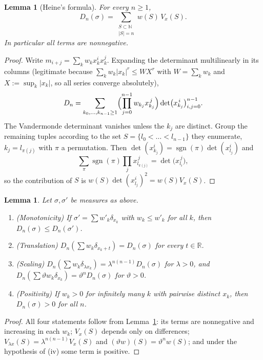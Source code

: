 \documentclass{amsart}
\newtheorem{lemma}[theorem]{Lemma}
\theoremstyle{definition}
\theoremstyle{remark}
\numberwithin{equation}{section}
\newcommand{\N}{\mathbb{N}}
\newcommand{\R}{\mathbb{R}}
\begin{document}
\begin{lemma}[Heine's formula]\label{lem:heine}
For every $n\ge1$,
\[
  D_n(\sigma)=\sum_{\substack{S\subset\N\\|S|=n}}w(S)\,V_x(S).
\]
In particular all terms are nonnegative.
\end{lemma}

\begin{proof}
Write $m_{i+j}=\sum_kw_kx_k^ix_k^j$. Expanding the determinant multilinearly in its columns (legitimate because
$\sum_kw_k|x_k|^r\le WX^r$ with $W=\sum_kw_k$ and $X:=\sup_k|x_k|$, so all series converge absolutely),
\[
  D_n=\sum_{k_0,\dots,k_{n-1}\ge1}\Bigl(\prod_{j=0}^{n-1}w_{k_j}x_{k_j}^{\,j}\Bigr)\det\bigl(x_{k_j}^{\,i}\bigr)_{i,j=0}^{n-1}.
\]
The Vandermonde determinant vanishes unless the $k_j$ are distinct. Group the remaining tuples according to the set
$S=\{l_0<\dots<l_{n-1}\}$ they enumerate, $k_j=l_{\pi(j)}$ with $\pi$ a permutation. Then
$\det(x_{k_j}^i)=\operatorname{sgn}(\pi)\det(x_{l_j}^i)$ and
\[
  \sum_\pi\operatorname{sgn}(\pi)\prod_jx_{l_{\pi(j)}}^{\,j}=\det\bigl(x_{l_i}^{\,j}\bigr),
\]
so the contribution of $S$ is $w(S)\det(x_{l_j}^i)^2=w(S)V_x(S)$.
\end{proof}

\begin{lemma}\label{lem:elem}
Let $\sigma,\sigma'$ be measures as above.
\begin{enumerate}
\item (Monotonicity) If $\sigma'=\sum w'_k\delta_{x_k}$ with $w_k\le w'_k$ for all $k$, then
  $D_n(\sigma)\le D_n(\sigma')$.
\item (Translation) $D_n(\sum w_k\delta_{x_k+t})=D_n(\sigma)$ for every $t\in\R$.
\item (Scaling) $D_n(\sum w_k\delta_{\lambda x_k})=\lambda^{n(n-1)}D_n(\sigma)$ for $\lambda>0$, and
  $D_n(\sum\vartheta w_k\delta_{x_k})=\vartheta^nD_n(\sigma)$ for $\vartheta>0$.
\item (Positivity) If $w_k>0$ for infinitely many $k$ with pairwise distinct $x_k$, then $D_n(\sigma)>0$ for all $n$.
\end{enumerate}
\end{lemma}

\begin{proof}
All four statements follow from Lemma~\ref{lem:heine}: its terms are nonnegative and increasing in each $w_k$;
$V_x(S)$ depends only on differences; $V_{\lambda x}(S)=\lambda^{n(n-1)}V_x(S)$ and $(\vartheta w)(S)=\vartheta^nw(S)$; and under the
hypothesis of (iv) some term is positive.
\end{proof}
\end{document}
